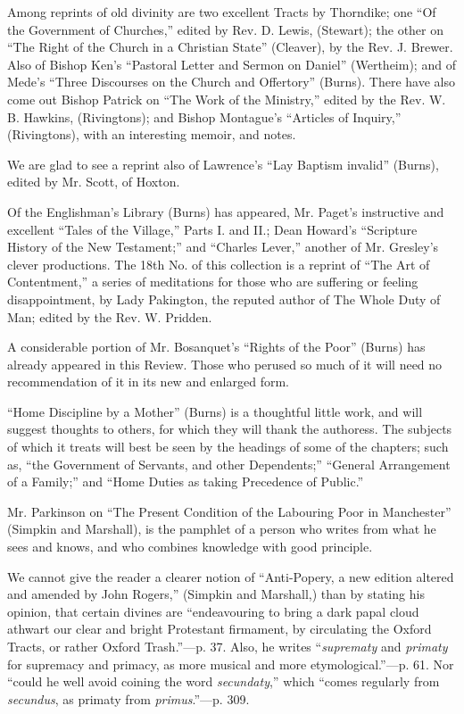 Among reprints of old divinity are two excellent
Tracts by Thorndike; one ``Of the Government of Churches,'' edited by Rev.
D. Lewis, (Stewart); the other on ``The Right of the Church in a
Christian State'' (Cleaver), by the Rev. J. Brewer. Also of Bishop Ken's ``Pastoral
Letter and Sermon on Daniel'' (Wertheim); and of Mede's ``Three Discourses
on the Church and Offertory'' (Burns). There have also come out Bishop
Patrick on ``The Work of the Ministry,'' edited by the Rev. W. B. Hawkins,
(Rivingtons); and Bishop Montague's ``Articles of Inquiry,'' (Rivingtons),
with an interesting memoir, and notes.

We are glad to see a reprint also of Lawrence's ``Lay
Baptism invalid'' (Burns), edited by Mr. Scott, of Hoxton.

Of the Englishman's Library (Burns) has appeared,
Mr. Paget's instructive and excellent ``Tales of the Village,'' Parts I.
and II.; Dean Howard's ``Scripture History of the New Testament;'' and ``Charles
Lever,'' another of Mr. Gresley's clever productions. The 18th No. of
this collection is a reprint of ``The Art of Contentment,'' a series of
meditations for those who are suffering or feeling disappointment, by
Lady Pakington, the reputed author of The Whole Duty of Man; edited by
the Rev. W. Pridden.

A considerable portion of Mr. Bosanquet's ``Rights
of the Poor'' (Burns) has already appeared in this Review. Those who
perused so much of it will need no recommendation of it in its new and
enlarged form.

``Home Discipline by a Mother'' (Burns) is a
thoughtful little work, and will suggest thoughts to others, for which
they will thank the authoress. The subjects of which it treats will best
be seen by the headings of some of the chapters; such as, ``the
Government of Servants, and other Dependents;'' ``General Arrangement of a
Family;'' and ``Home Duties as taking Precedence of Public.''

Mr. Parkinson on ``The Present Condition of the
Labouring Poor in Manchester'' (Simpkin and Marshall), is the pamphlet of
a person who writes from what he sees and knows, and who combines
knowledge with good principle.

We cannot give the reader a clearer notion of ``Anti-Popery,
a new edition altered and amended by John Rogers,'' (Simpkin and
Marshall,) than by stating his opinion, that certain divines are ``endeavouring
to bring a dark papal cloud athwart our clear and bright Protestant
firmament, by circulating the Oxford Tracts, or rather Oxford Trash.''—p.
37. Also, he writes ``\emph{suprematy} and \emph{primaty} for supremacy
and primacy, as more musical and more etymological.''—p. 61. Nor ``could
he well avoid coining the word \emph{secundaty},'' which ``comes regularly
from \emph{secundus}, as primaty from \emph{primus}.''—p. 309.

